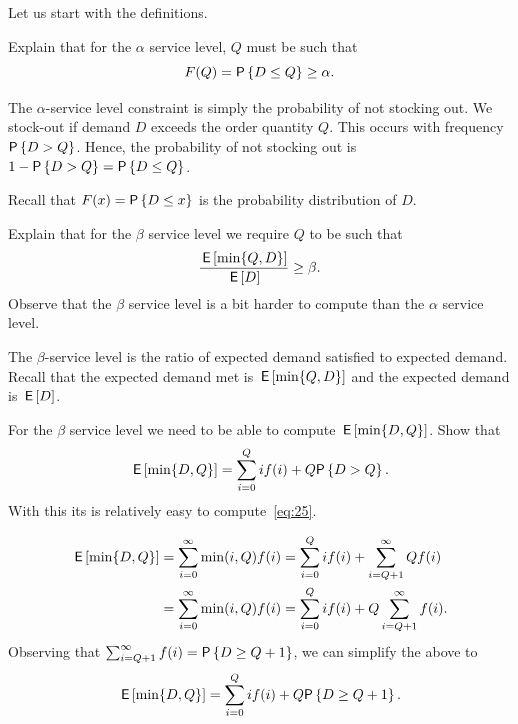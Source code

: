 Let us start with the definitions.
\begin{exercise}
Explain that for the $\alpha$ service level, $Q$ must be such  that
\begin{equation}\label{eq:26}
  F(Q) = \P{D\leq Q} \geq \alpha.
\end{equation}
\begin{solution}
The $\alpha$-service level constraint is simply the probability of not stocking out. We stock-out if demand $D$ exceeds the order quantity $Q$. This occurs with frequency $\P{D> Q}$. Hence, the probability of not stocking out is $1-\P{D>Q} = \P{D\leq Q}$. 

Recall that $F(x) = \P{D\leq x}$ is the probability distribution of $D$. 
\end{solution}
\end{exercise}

\begin{exercise}
Explain that for the  $\beta$ service level we require $Q$ to be  such that
\begin{align}\label{eq:25}
\frac{\,\mathsf{E}\left[\min\{Q, D\}\right]}{\,\mathsf{E}\left[D\right]} \geq \beta.
\end{align}
Observe that the $\beta$ service level is a bit harder to compute than the $\alpha$ service level.

\begin{solution}
The $\beta$-service level is the ratio of expected demand satisfied to expected demand. Recall that the expected demand met is $\,\mathsf{E}\left[\min\{Q, D\}\right]$ and the expected demand is $\,\mathsf{E}\left[D\right]$. 
\end{solution}
\end{exercise}

\begin{exercise}
For the $\beta$ service level we need to be able to compute  $\,\mathsf{E}\left[\min\{D,Q\}\right]$. Show that
\begin{equation*}
  \E{\min\{D,Q\}} = \sum_{i=0}^Q i\/ f(i) + Q\/\P{D> Q}.
\end{equation*}
With this its is relatively easy to compute~\eqref{eq:25}. 
  \begin{solution}
\begin{align*}
  \,\mathsf{E}\left[\min\{D,Q\}\right] 
&= \sum_{i=0}^\infty \min(i,Q)f(i) = \sum_{i=0}^Q i f(i) + \sum_{i=Q+1}^\infty Q f(i) \\
&= \sum_{i=0}^\infty \min(i,Q)f(i) = \sum_{i=0}^Q i f(i) + Q \sum_{i=Q+1}^\infty f(i).
\end{align*}
Observing that $\sum_{i=Q+1}^\infty f(i)=\P{D\geq Q+1}$,  we can simplify the above to
\begin{equation*}
  \E{\min\{D,Q\}} = \sum_{i=0}^Q i\/ f(i) + Q\/\P{D\geq Q+1}.
\end{equation*}
  \end{solution}
\end{exercise}


